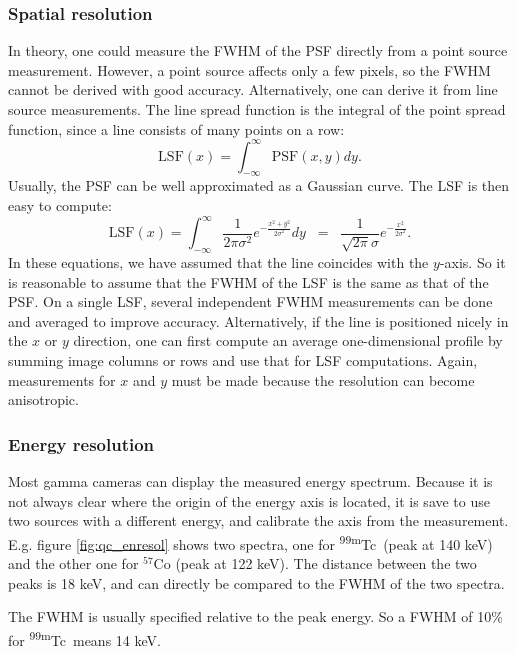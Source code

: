 \documentclass[11pt,oneside]{book}
\begin{document}
\subsubsection{Spatial resolution}
In theory, one could measure the FWHM of the PSF directly from a point source
measurement. However, a point source affects only a few pixels, so the FWHM
cannot be derived with good accuracy. Alternatively, one can derive it from
line source measurements. The line spread function is the integral of the
point spread function, since a line consists of many points on a row:
\begin{equation}
  \mbox{LSF}(x) = \int_{-\infty}^{\infty} \mbox{PSF}(x,y) dy.
\end{equation}
Usually, the PSF can be well approximated as a Gaussian curve. The LSF is then
easy to compute:
\begin{equation}
  \mbox{LSF}(x)  =  \int_{-\infty}^{\infty} 
    \frac{1}{2 \pi \sigma^2} e^{- \frac{x^2 + y^2}{2 \sigma^2}} dy
 \;\; = \;\; \frac{1}{\sqrt{2 \pi} \sigma} e^{- \frac{x^2}{2 \sigma^2}}.
\end{equation}
In these equations, we have assumed that the line coincides with the
$y$-axis. So it is reasonable to assume that the FWHM of the LSF is the same
as that of the PSF.  On a single LSF, several independent FWHM measurements
can be done and averaged to improve accuracy. Alternatively, if the line is
positioned nicely in the $x$ or $y$ direction, one can first compute an
average one-dimensional profile by summing image columns or rows and use that
for LSF computations.  Again, measurements for $x$ and $y$ must be made
because the resolution can become anisotropic.

\subsubsection{Energy resolution}
Most gamma cameras can display the measured energy spectrum. Because it is not
always clear where the origin of the energy axis is located, it is save to use
two sources with a different energy, and calibrate the axis from the
measurement. E.g. figure \ref{fig:qc_enresol} shows two spectra, one for
\textsuperscript{99m}Tc\ (peak at 140 keV) and the other one for $^{57}$Co (peak at 122
keV). The distance between the two peaks is 18 keV, and can directly be
compared to the FWHM of the two spectra.

The FWHM is usually specified relative to the peak energy. So a FWHM of 10\%
for \textsuperscript{99m}Tc\ means 14 keV.
\end{document}

